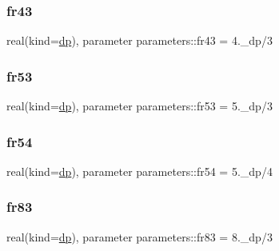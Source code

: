 \mbox{\label{group__FRACTIONS_ga1705bf89adaf6e54bdf027386ecdc5a9}} 
\subsubsection{\texorpdfstring{fr43}{fr43}}
{\footnotesize\ttfamily real(kind=\mbox{\hyperlink{namespaceparameters_a52f8c6351fd79345d8811e065bcbbb37}{dp}}), parameter parameters\+::fr43 = 4.\+\_\+dp/3}

\mbox{\label{group__FRACTIONS_ga348f3739fc94f9786aeb6045a5c9c76b}} 
\subsubsection{\texorpdfstring{fr53}{fr53}}
{\footnotesize\ttfamily real(kind=\mbox{\hyperlink{namespaceparameters_a52f8c6351fd79345d8811e065bcbbb37}{dp}}), parameter parameters\+::fr53 = 5.\+\_\+dp/3}

\mbox{\label{group__FRACTIONS_ga4b5dee914c69f248bc576e0ef5a48cad}} 
\subsubsection{\texorpdfstring{fr54}{fr54}}
{\footnotesize\ttfamily real(kind=\mbox{\hyperlink{namespaceparameters_a52f8c6351fd79345d8811e065bcbbb37}{dp}}), parameter parameters\+::fr54 = 5.\+\_\+dp/4}

\mbox{\label{group__FRACTIONS_ga74e22f362165a8830c6acb135f54921a}} 
\subsubsection{\texorpdfstring{fr83}{fr83}}
{\footnotesize\ttfamily real(kind=\mbox{\hyperlink{namespaceparameters_a52f8c6351fd79345d8811e065bcbbb37}{dp}}), parameter parameters\+::fr83 = 8.\+\_\+dp/3}

